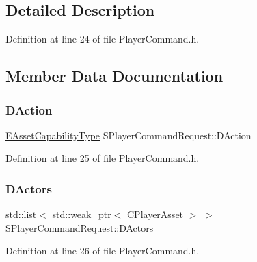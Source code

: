 \subsection{Detailed Description}


Definition at line 24 of file Player\+Command.\+h.



\subsection{Member Data Documentation}
\hypertarget{structSPlayerCommandRequest_a80897bbccf2c4e0b148a7aa815a926c6}{}\label{structSPlayerCommandRequest_a80897bbccf2c4e0b148a7aa815a926c6} 
\subsubsection{\texorpdfstring{D\+Action}{DAction}}
{\footnotesize\ttfamily \hyperlink{GameDataTypes_8h_a35b98ce26aca678b03c6f9f76e4778ce}{E\+Asset\+Capability\+Type} S\+Player\+Command\+Request\+::\+D\+Action}



Definition at line 25 of file Player\+Command.\+h.

\hypertarget{structSPlayerCommandRequest_aa37fc01519676345703d78b9f573894a}{}\label{structSPlayerCommandRequest_aa37fc01519676345703d78b9f573894a} 
\subsubsection{\texorpdfstring{D\+Actors}{DActors}}
{\footnotesize\ttfamily std\+::list$<$ std\+::weak\+\_\+ptr$<$ \hyperlink{classCPlayerAsset}{C\+Player\+Asset} $>$ $>$ S\+Player\+Command\+Request\+::\+D\+Actors}



Definition at line 26 of file Player\+Command.\+h.

\hypertarget{structSPlayerCommandRequest_a3690a5117efe6214d92f18d672b5714f}{}\label{structSPlayerCommandRequest_a3690a5117efe6214d92f18d672b5714f} 

